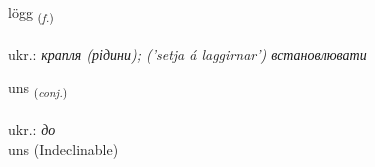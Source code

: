 \documentclass[frontgrid, backgrid]{flacards}\usepackage[]{graphicx}\usepackage[]{xcolor}
\begin{document}
\renewcommand{\flhead}{\vskip5pt \fboxsep=0pt {\small\bfseries\footnotesize Nafnorð | іменник}}
\renewcommand{\fcfoot}{\vskip5pt \fboxsep=0pt \hspace{2pt}{\small\bfseries\footnotesize 3K}}

\renewcommand{\blhead}{\vskip5pt {\small\bfseries\footnotesize Nafnorð | іменник }}
\renewcommand{\bcfoot}{\vskip5pt \hspace{2pt}{\small\bfseries\footnotesize 3K}}


{lögg \small{\textsubscript{(\textit{f.})}} \\[1ex] %
\textphonetic{[lœk]} \\
ukr.: \emph{крапля (рідини); ('setja á laggirnar') встановлювати} \\  [2ex]
\renewcommand*{\arraystretch}{0.8}
}


\renewcommand{\flhead}{\vskip5pt \fboxsep=0pt {\small\bfseries\footnotesize Samtenging | сполучник}}
\renewcommand{\fcfoot}{\vskip5pt \fboxsep=0pt \hspace{2pt}{\small\bfseries\footnotesize 3K}}

\renewcommand{\blhead}{\vskip5pt {\small\bfseries\footnotesize Samtenging | сполучник }}
\renewcommand{\bcfoot}{\vskip5pt \hspace{2pt}{\small\bfseries\footnotesize 3K}}


{uns \small{\textsubscript{(\textit{conj.})}} \\[1ex]
\textphonetic{[ʏns]} \\
ukr.: \emph{до} \\  [2ex]
uns (Indeclinable)}

\renewcommand{\flhead}{\vskip5pt \fboxsep=0pt {\small\bfseries\footnotesize Nafnorð | іменник}}
\renewcommand{\fcfoot}{\vskip5pt \fboxsep=0pt \hspace{2pt}{\small\bfseries\footnotesize 3K}}
\end{document}
